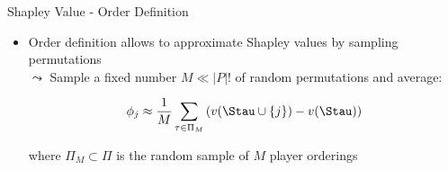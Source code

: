 \documentclass[11pt,compress,t,notes=noshow, aspectratio=169, xcolor=table]{beamer}
\begin{document}
\begin{frame}{Shapley Value - Order Definition}
\begin{itemize}[<+->]
  \phantom{$\Rightarrow$} $\leadsto$ For joining order $\tau = (\footnotesize\colorcircle{playerblue}{white}{3},\colorcircle{playerred}{white}{1},\colorcircle{playeryellow}{white}{2})$ and player  $j=\footnotesize\colorcircle{playerred}{white}{1}$ $\Rightarrow$ $\Stau = \footnotesize\{\colorcircle{playerblue}{white}{3}\}$
\item<3-> Order definition allows to approximate Shapley values by sampling permutations \\
\(\leadsto\) Sample a fixed number \( M \ll |P|! \) of random permutations and average:

\[
\phi_j \approx \frac{1}{M} \sum_{\tau \in \Pi_M} \left(v(\Stau \cup \{j\}) - v(\Stau)\right)
\]

where \( \Pi_M \subset \Pi \) is the random sample of \( M \) player orderings
\end{itemize}

\end{frame}
\end{document}
